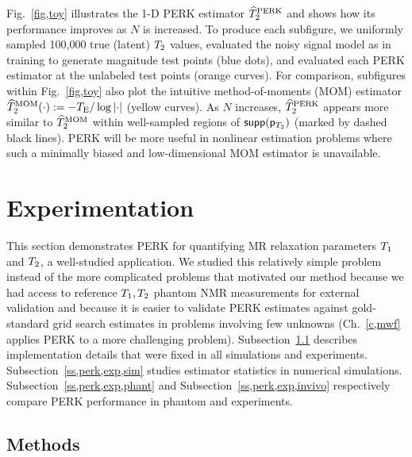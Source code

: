 Fig.~\ref{fig,toy} illustrates the 1-D PERK estimator $\widehat{T}_2^{\mathrm{PERK}}$
and shows how its performance improves
as $N$ is increased. 
To produce each subfigure,
we uniformly sampled 100,000 true (latent) $T_2$ values,
evaluated the noisy signal model as in training
to generate magnitude test points (blue dots),
and evaluated each PERK estimator 
at the unlabeled test points (orange curves).
For comparison,
subfigures within Fig.~\ref{fig,toy} also plot
the intuitive method-of-moments (MOM) estimator
$\TtMOM\paren{\cdot} := -\TE/\log{\abs{\cdot}}$ (yellow curves).
As $N$ increases,
$\widehat{T}_2^{\mathrm{PERK}}$ appears more similar to $\widehat{T}_2^{\mathrm{MOM}}$
within well-sampled regions of $\supp{\dist{\Tt}}$ 
(marked by dashed black lines).
PERK will be more useful
in nonlinear estimation problems
where such a minimally biased 
and low-dimensional MOM estimator is unavailable.

\section{Experimentation}
\label{s,perk,exp}

This section demonstrates PERK 
for quantifying 
MR relaxation parameters $T_1$ and $T_2$,
a well-studied application.
We studied this relatively simple problem 
instead of the more complicated problems
that motivated our method
because we had access 
to reference $T_1,T_2$ phantom NMR measurements \cite{keenan:16:msm}
for external validation
and because it is easier
to validate PERK estimates
against gold-standard grid search estimates
in problems involving few unknowns
(Ch.~\ref{c,mwf} applies PERK
to a more challenging problem).
Subsection~\ref{ss,perk,exp,meth} describes implementation details
that were fixed in all simulations and experiments.
Subsection~\ref{ss,perk,exp,sim} studies estimator statistics
in numerical simulations.
Subsection~\ref{ss,perk,exp,phant} and Subsection~\ref{ss,perk,exp,invivo}
respectively compare PERK performance
in phantom and \invivo experiments.

\subsection{Methods}
\label{ss,perk,exp,meth}

